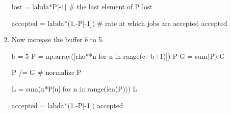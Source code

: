 \begin{exercise}
\begin{solution}
\begin{enumerate}
\begin{pyconsole}
lost = labda*P[-1] # the last element of P
lost

accepted = labda*(1.-P[-1]) # rate at which jobs are accepted
accepted
\end{pyconsole}  

\item 
Now increase the buffer $b$ to 5.

\begin{pyconsole}
b = 5
P = np.array([rho**n for n in range(c+b+1)])
P
G = sum(P)
G

P /= G # normalize
P

L = sum(n*P[n] for n in range(len(P)))
L

accepted = labda*(1.-P[-1])
accepted
\end{pyconsole}      
  \end{enumerate}
    \end{solution}
\end{exercise}

\begin{comment}
\begin{exercise}[use=false]
  The code is in \texttt{progs/mm1\_waiting\_time_distribution.py}. In
  mm1\_waiting\_time_distribution.py we compute the waiting time
  distribution. At this point in the text this distribution has not
  yet been derived.  This problem should be moved to another section.

Consider an $M/M/1$ queue with $\mu=1.2$ per hour. Make plots of the
waiting time distribution $\P{W_Q\leq t}$ for various values of
$\lambda$ to show the dependency on the arrival rate. Compare this to
the dependence of average waiting time $\E{W_Q}$ on $\lambda$.

The idea of making such plots is to analyze
  whether the service capacity suffices for a situation in which one
  doesn't know the arrival rate very accurately, but one can control
  the service rate, e.g., by hiring personnel.
  \begin{solution}
    Let's just plot the waiting time distribution
for various values of $\lambda$. 


\begin{figure}[ht]
  \centering
\texttt{[image: progs/mm1\_waiting\_time.tex]}
  \caption{The waiting time distribution for various values of the arrival rate.}
  \label{fig:waitingtime}
\end{figure}


\end{solution}

\end{exercise}
\end{comment}


